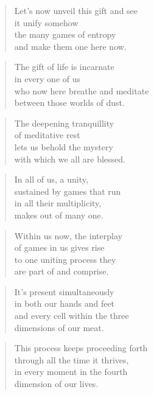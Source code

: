 \documentclass[14pt,a4paper]{article}
\begin{document}
\begin{verse}
Let’s now unveil this gift and see\\
it unify somehow\\
the many games of entropy\\
and make them one here now.
\end{verse}

\begin{verse}
\end{verse}

\begin{verse}
The gift of life is incarnate\\
in every one of us\\
who now here breathe and meditate\\
between those worlds of dust.
\end{verse}

\begin{verse}
The deepening tranquillity\\
of meditative rest\\
lets us behold the mystery\\
with which we all are blessed.
\end{verse}

\begin{verse}
In all of us, a unity,\\
sustained by games that run\\
in all their multiplicity,\\
makes out of many one.
\end{verse}

\begin{verse}
Within us now, the interplay\\
of games in us gives rise\\
to one uniting process they\\
are part of and comprise.
\end{verse}

\begin{verse}
It’s present simultaneously\\
in both our hands and feet\\
and every cell within the three\\
dimensions of our meat.
\end{verse}

\begin{verse}
This process keeps proceeding forth\\
through all the time it thrives,\\
in every moment in the fourth\\
dimension of our lives.
\end{verse}
\end{document}
